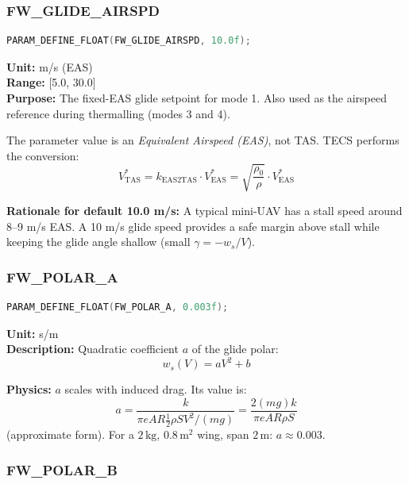 \documentclass[12pt,a4paper]{article}
\begin{document}
\subsubsection{FW\_GLIDE\_AIRSPD}

\begin{lstlisting}[language=C]
PARAM_DEFINE_FLOAT(FW_GLIDE_AIRSPD, 10.0f);
\end{lstlisting}

\textbf{Unit:} m/s (EAS) \\
\textbf{Range:} [5.0, 30.0] \\
\textbf{Purpose:} The fixed-EAS glide setpoint for mode 1. Also used as
the airspeed reference during thermalling (modes 3 and 4).

The parameter value is an \emph{Equivalent Airspeed (EAS)}, not TAS.
TECS performs the conversion:
\begin{equation}
  V_{\text{TAS}}^* = k_{\text{EAS2TAS}} \cdot V_{\text{EAS}}^*
  = \sqrt{\frac{\rho_0}{\rho}} \cdot V_{\text{EAS}}^*
\end{equation}

\textbf{Rationale for default 10.0 m/s:} A typical mini-UAV has a stall
speed around 8--9 m/s EAS. A 10 m/s glide speed provides a safe margin
above stall while keeping the glide angle shallow (small $\gamma = -w_s/V$).

\subsubsection{FW\_POLAR\_A}

\begin{lstlisting}[language=C]
PARAM_DEFINE_FLOAT(FW_POLAR_A, 0.003f);
\end{lstlisting}

\textbf{Unit:} s/m \\
\textbf{Description:} Quadratic coefficient $a$ of the glide polar:
\begin{equation}
  w_s(V) = a V^2 + b
\end{equation}

\textbf{Physics:} $a$ scales with induced drag. Its value is:
\begin{equation}
  a = \frac{k}{\pi e AR \frac{1}{2}\rho S V^2 / (mg)} 
  = \frac{2(mg)k}{\pi e AR \rho S}
\end{equation}
(approximate form). For a $2\,\text{kg}$, $0.8\,\text{m}^2$ wing, span
$2\,\text{m}$: $a \approx 0.003$.

\subsubsection{FW\_POLAR\_B}
\end{document}
